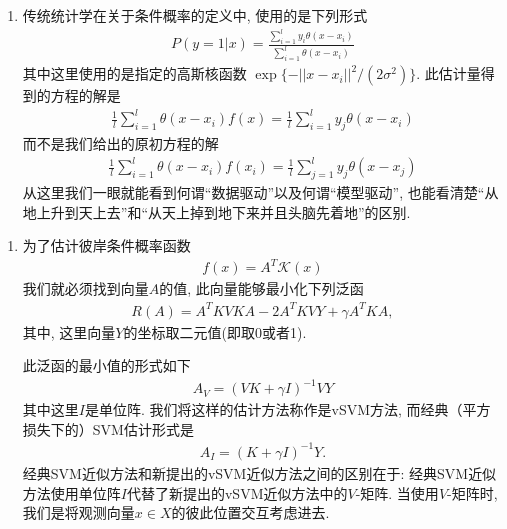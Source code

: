 \documentclass[compress,10pt,dvipsnames,notheorems]{beamer} %
\begin{document}
\begin{frame}
\begin{enumerate}
\item 传统统计学在关于条件概率的定义中, 使用的是下列形式
\begin{align*}
P(y=1|x) = \frac{\sum_{i=1}^{l}y_{i}\theta(x-x_{i})}{\sum_{i=1}^{l}\theta(x-x_{i})}
\end{align*}
其中这里使用的是指定的高斯核函数 $\exp \{-||x - x_{i}||^{2}/(2\sigma^{2})\}$. 此估计量得到的方程的解是
\begin{align*}
\frac{1}{l}\sum_{i=1}^{l}\theta(x-x_{i})f(x) = \frac{1}{l}\sum_{i=1}^{l}y_{j}\theta(x-x_{i})
\end{align*}
而不是我们给出的原初方程的解
\begin{align*}
\frac{1}{l}\sum_{i=1}^{l}\theta(x-x_{i})f(x_{i}) = \frac{1}{l}\sum_{j=1}^{l}y_{j}\theta(x-x_{j})
\end{align*}
从这里我们一眼就能看到何谓“数据驱动”以及何谓“模型驱动”, 也能看清楚“从地上升到天上去”和“从天上掉到地下来并且头脑先着地”的区别.
\end{enumerate}
\end{frame}

\begin{frame}
\begin{enumerate}
\item 为了估计彼岸条件概率函数
\begin{align}\label{ml7}
f(x) = A^{T}\mathcal{K}(x)
\end{align}
我们就必须找到向量$A$的值, 此向量能够最小化下列泛函
\begin{align}
\label{ml8}
R(A) = A^{T}KVKA - 2A^{T}KVY + \gamma A^{T}KA,
\end{align}
其中, 这里向量$Y$的坐标取二元值(即取0或者1).

此泛函的最小值的形式如下
\begin{align}
\label{ml9}
A_{V} = (VK + \gamma {I})^{-1}VY
\end{align}
其中这里$I$是单位阵. 我们将这样的估计方法称作是{vSVM}方法, 而经典（平方损失下的）SVM估计形式是
\begin{align}
\label{ml10}
A_{I} = (K + \gamma I)^{-1}Y.
\end{align}
经典{SVM}近似方法和新提出的{vSVM}近似方法之间的区别在于: 经典{SVM}近似方法使用单位阵$I$代替了新提出的{vSVM}近似方法中的$V$-矩阵. 当使用$V$-矩阵时, 我们是将观测向量$x \in X$的彼此位置交互考虑进去. 
\end{enumerate}
\end{frame}
\end{document}

